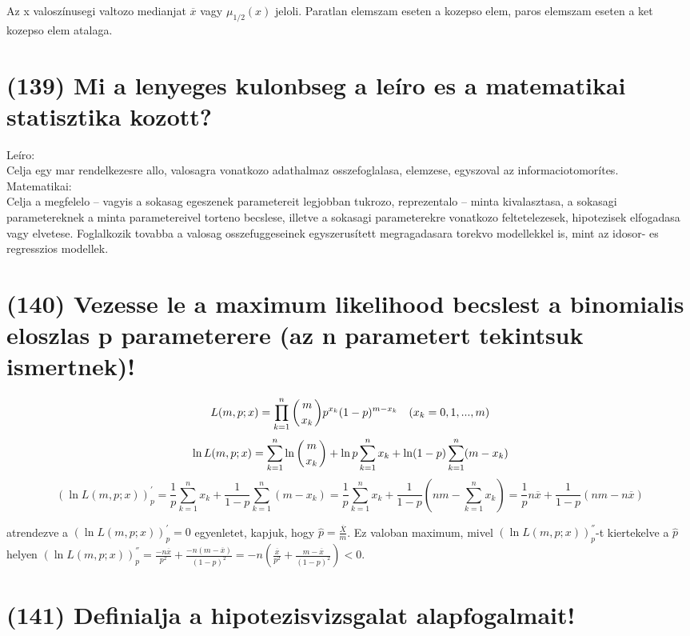 \documentclass[12p]{article}
\begin{document}
Az x valoszínusegi valtozo medianjat $\overline{x}$ vagy $\mu_{1/2}(x)$ jeloli.
Paratlan elemszam eseten a kozepso elem, paros elemszam eseten a ket kozepso elem atalaga.

\section{(139) Mi a lenyeges kulonbseg a leíro es a matematikai statisztika kozott?}

Leíro:\\
Celja egy mar rendelkezesre allo, valosagra vonatkozo adathalmaz osszefoglalasa, elemzese, egyszoval az informaciotomorítes.\\
Matematikai:\\
Celja a megfelelo – vagyis a sokasag egeszenek parametereit legjobban tukrozo, reprezentalo – minta kivalasztasa, a sokasagi parametereknek a minta parametereivel torteno becslese, illetve a sokasagi parameterekre vonatkozo feltetelezesek, hipotezisek elfogadasa vagy elvetese. Foglalkozik tovabba a valosag osszefuggeseinek egyszerusített megragadasara torekvo modellekkel is, mint az idosor- es regresszios modellek.

\section{(140) Vezesse le a maximum likelihood becslest a binomialis eloszlas p parameterere (az n parametert tekintsuk ismertnek)!}

$$L(m, p; x) = \prod_{k=1}^n \displaystyle{\left({m \atop x_k}\right)}p^{x_k}(1-p)^{m-x_k} \quad (x_k = 0, 1, ..., m)$$
$$\ln L(m, p; x) = \sum^n_{k=1} \ln \left ({m \atop x_k}\right) + \ln p \sum^n_{k=1} x_k + \ln(1-p) \sum^n_{k=1}(m-x_k)$$
$$(\ln L(m,p;x))^{'}_p = \frac{1}{p} \sum^n_{k=1}x_k + \frac{1}{1-p} \sum^n_{k=1} (m - x_k) = \frac{1}{p} \sum^n_{k=1}x_k + \frac{1}{1-p}
\left(nm- \sum^n_{k=1}x_k \right) = \frac{1}{p}n\overline{x} + \frac{1}{1-p}(nm-n\overline{x})$$

atrendezve a $(\ln L(m,p;x))^{'}_p = 0$ egyenletet, kapjuk, hogy $\hat{p} = \frac{\overline{X}}{m}$.  Ez valoban maximum, mivel $(\ln L(m,p;x))^{''}_p$-t kiertekelve a $\hat{p}$ helyen $(\ln L(m,p;x))^{''}_p = \frac{-n \overline{x}}{p^2} + \frac{-n(m-\overline{x})}{(1-p)^2}=
-n\left(\frac{\overline{x}}{p^2}+\frac{m - \overline{x}}{(1-p)^2}\right)<0$.

\section{(141) Definialja a hipotezisvizsgalat alapfogalmait!}
\end{document}
